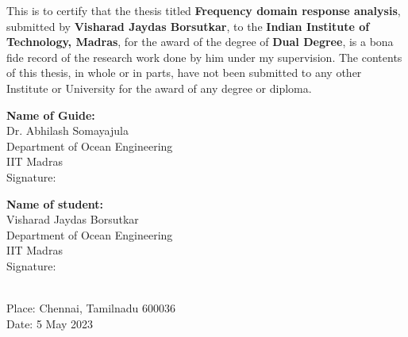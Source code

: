 \certificate


This is to certify that the thesis titled {\bf  Frequency domain response analysis}, 
submitted by {\bf Visharad Jaydas Borsutkar}, to the
 {\bf Indian Institute of Technology, Madras}, for the award of the degree of 
 {\bf Dual Degree}, is a bona fide record of the research work done by him under my 
 supervision. The contents of this thesis, in whole or in parts, have not been submitted 
 to any other Institute or University for the award of any degree or diploma.
\\[2.5cm]


\begin{minipage}[t]{0.45\textwidth}
    \textbf{Name of Guide:} \\
    Dr. Abhilash Somayajula\\
    Department of Ocean Engineering\\
    IIT Madras\\

    \vspace{1em}
    Signature:

\end{minipage}%
\hspace{1cm}
\begin{minipage}[t]{0.45\textwidth}
    \textbf{Name of student:} \\
    Visharad Jaydas Borsutkar \\
    Department of Ocean Engineering\\
    IIT Madras\\

    \vspace{1em}
    Signature:
\end{minipage}
\\[2cm]

\noindent Place: Chennai, Tamilnadu 600036\\
Date: 5 May 2023  